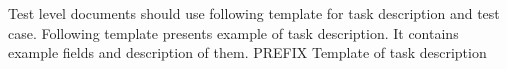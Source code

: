 \begin{comment}
			\begin{table}
			\caption{Example task description (for one task)}
			\label{tab:example-task-description}
			\centering
			\begin{tabular}{@{}lp{0.7\linewidth}lp{}}
			\toprule
			\emph{Task} & Generate system test design \\
			\midrule
			\emph{Methods} & Ensure that test design correctly emanates from the system test plan and conforms
			to IEEE Std 829-2008 regarding purpose, format, and content.\\
			\emph{Inputs} & System Test Plan, IEEE Std 829-2008 \\
			\emph{Outputs} & System Test Design, provide input to Master Test Report \\
			\emph{Schedule} & Initiate (with all inputs received) 30 days after the start of the project. Must be
			completed and approved 120 days after start of project. \\
			\emph{Resources} & Refer to MTP clause 1.5.4. \\
			\emph{Risk(s) and assumptions} & Risk: adequacy and timeliness of the test plans
			Assumption: Timeliness is a primary concern because the team writing the test
			cases is dependent on the receipt of this the test plans \\
			\emph{Roles and responsibilities} & Refer to MTP clause 1.5.5. \\
			\bottomrule
			\end{tabular}
			\end{table}
			$>$
		\end{comment}
	Test level documents should use following template for task description and test case. Following template presents example of task description. It contains example fields and description of them.	
	\taskdescription
	{
		PREFIX
	}
	{
		Template of task description
	}
